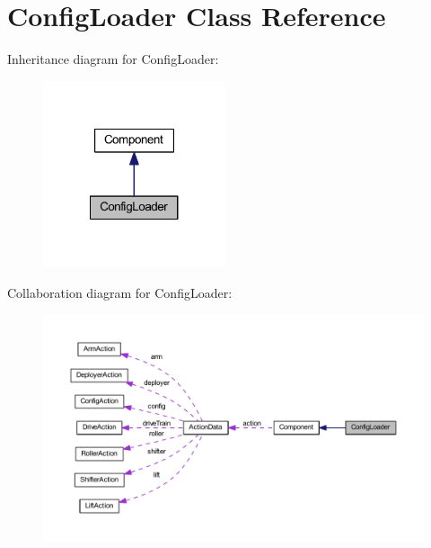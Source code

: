 \hypertarget{class_config_loader}{
\section{\-Config\-Loader \-Class \-Reference}
\label{class_config_loader}
}


\-Inheritance diagram for \-Config\-Loader\-:\nopagebreak
\begin{figure}[H]
\begin{center}
\leavevmode
\includegraphics[width=152pt]{class_config_loader__inherit__graph}
\end{center}
\end{figure}


\-Collaboration diagram for \-Config\-Loader\-:\nopagebreak
\begin{figure}[H]
\begin{center}
\leavevmode
\includegraphics[width=350pt]{class_config_loader__coll__graph}
\end{center}
\end{figure}
